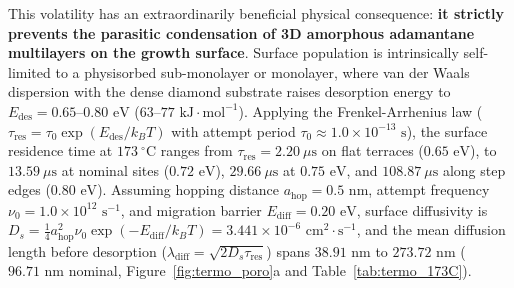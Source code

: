 \documentclass[10pt,twocolumn,a4paper]{article}
\begin{document}
This volatility has an extraordinarily beneficial physical consequence: \textbf{it strictly prevents the parasitic condensation of 3D amorphous adamantane multilayers on the growth surface}. Surface population is intrinsically self-limited to a physisorbed sub-monolayer or monolayer, where van der Waals dispersion with the dense diamond substrate raises desorption energy to $E_{\text{des}} = 0.65\text{--}0.80\text{ eV}$ ($63\text{--}77\text{ kJ}\cdot\text{mol}^{-1}$). Applying the Frenkel-Arrhenius law ($\tau_{\text{res}} = \tau_0 \exp(E_{\text{des}}/k_B T)$ with attempt period $\tau_0 \approx 1.0 \times 10^{-13}\text{ s}$), the surface residence time at $173\ ^\circ\text{C}$ ranges from $\tau_{\text{res}} = 2.20\ \mu\text{s}$ on flat terraces ($0.65\text{ eV}$), to $13.59\ \mu\text{s}$ at nominal sites ($0.72\text{ eV}$), $29.66\ \mu\text{s}$ at $0.75\text{ eV}$, and $108.87\ \mu\text{s}$ along step edges ($0.80\text{ eV}$). Assuming hopping distance $a_{\text{hop}} = 0.5\text{ nm}$, attempt frequency $\nu_0 = 1.0 \times 10^{12}\text{ s}^{-1}$, and migration barrier $E_{\text{diff}} = 0.20\text{ eV}$, surface diffusivity is $D_s = \frac{1}{4}a_{\text{hop}}^2 \nu_0 \exp(-E_{\text{diff}}/k_B T) = 3.441 \times 10^{-6}\text{ cm}^2\cdot\text{s}^{-1}$, and the mean diffusion length before desorption ($\lambda_{\text{diff}} = \sqrt{2 D_s \tau_{\text{res}}}$) spans $38.91\text{ nm}$ to $273.72\text{ nm}$ ($96.71\text{ nm}$ nominal, Figure~\ref{fig:termo_poro}a and Table~\ref{tab:termo_173C}).
\end{document}
